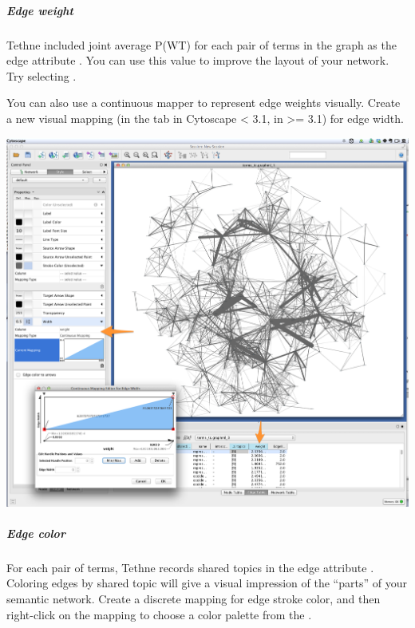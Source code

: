 \documentclass[letterpaper,10pt,english]{sphinxmanual}
\begin{document}
\subparagraph{Edge weight}
\label{tutorial.mallet:edge-weight}
Tethne included joint average P(W\textbar{}T) for each pair of terms in the graph as the edge
attribute . You can use this value to improve the layout of your network. Try
selecting .

You can also use a continuous mapper to represent edge weights visually. Create a new
visual mapping (in the  tab in Cytoscape \textless{} 3.1,  in \textgreater{}= 3.1) for
edge width.

{\hfill\includegraphics{cytoscape1.png}\hfill}


\subparagraph{Edge color}
\label{tutorial.mallet:edge-color}
For each pair of terms, Tethne records shared topics in the edge attribute .
Coloring edges by shared topic will give a visual impression of the ``parts'' of your
semantic network. Create a discrete mapping for edge stroke color, and then right-click on
the mapping to choose a color palette from the .
\end{document}
